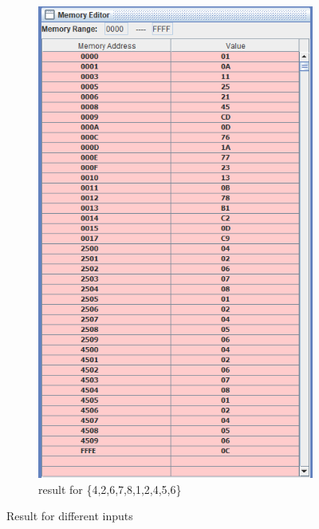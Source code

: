 \documentclass[a4paper]{article} %
\begin{document}
\begin{figure}[h!]
\begin{subfigure}[b]{0.49\linewidth}
            \end{subfigure}
            \begin{subfigure}[b]{0.49\linewidth}
                \centering
                \includegraphics[width=\linewidth]{Assignment 2/1_Move Blocks/10 data copy.png}
                \caption{result for \{4,2,6,7,8,1,2,4,5,6\}}
                \label{fg3b}
            \end{subfigure}
            \caption{Result for different inputs}
            \label{fg3}
        \end{figure}
\end{document}
